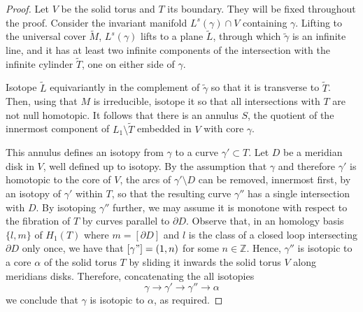 \documentclass[10pt,a4paper]{amsart}
\newcommand{\Z}{\mathbb{Z}}
\begin{document}
\begin{proof}
Let $V$ be the solid torus and $T$ its boundary. They will be fixed
throughout the proof. Consider the invariant manifold $L^s(\gamma) \cap V$ containing $\gamma$. Lifting to the universal cover $\tilde M$, $L^s(\gamma)$ lifts to a plane $\tilde L$, through which $\tilde\gamma$ is an infinite line, and it has at least two infinite components of the intersection with the infinite cylinder $\tilde T$, one on either side of $\gamma$.

 Isotope $\tilde L$ equivariantly in the complement of $\tilde\gamma$ so that it is transverse to $\tilde T$. Then, using that $M$ is irreducible, isotope it so that all
intersections with $T$ are not null homotopic. 
It follows that there is an annulus $S$, the quotient of the innermost component of $L_1\setminus \tilde T$ embedded in $V$ with core $\gamma$.

This annulus defines an isotopy from $\gamma$ to a curve $\gamma'\subset T$.  
Let $D$ be a meridian disk in $V$, well defined up to isotopy.
By the assumption that $\gamma$ and therefore $\gamma'$ is homotopic to the core of $V$, the arcs of $\gamma'\setminus D$ can be removed, innermost first, by an isotopy of $\gamma'$ within $T$, so that the resulting curve $\gamma''$ has a single intersection with $D$. By isotoping $\gamma''$ further, we may assume it is monotone with respect to the fibration of $T$ by curves parallel to $\partial D$.
Observe that, in an homology basis $\{l,m\}$ of $H_1(T)$ where $m=[\partial D]$ and $l$ is the class of a closed loop intersecting $\partial D$ only once, we have that $[\gamma"]=(1,n)$ for some $n\in\Z$. Hence, $\gamma''$ is isotopic to a core $\alpha$ of the solid torus $T$ by sliding it inwards the solid torus $V$ along meridians disks. Therefore, concatenating the all isotopies 
$$\gamma\to\gamma'\to\gamma ''\to\alpha$$ 
we conclude that $\gamma$ is isotopic to $\alpha$, as required.
\end{proof}
\end{document}
